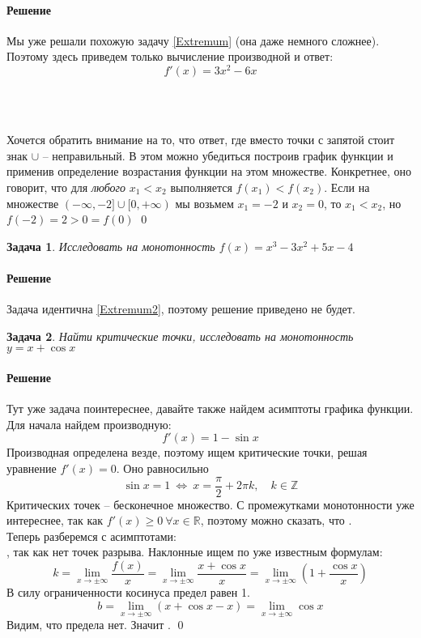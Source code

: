 \documentclass[a4paper,12pt]{report}
\newcommand{\R}{{\mathbb R}}
\newcommand{\fancy}[1]{{\mathbb{#1}}}
\newtheorem{problem}{Задача}[chapter]
\newenvironment{sol}{\paragraph{Решение}}{}
\newcommand{\uni}{\cup}
\begin{document}
	\begin{sol}
		Мы уже решали похожую задачу \ref{Extremum} (она даже немного сложнее). Поэтому здесь приведем только вычисление производной и ответ:
		\[
		f'(x)=3x^2-6x
		\]
		\begin{center}
			\\
			\vspace{1mm}
			\fbox{$f(x)$ возрастает на $(-\infty,-2]; \hspace{2mm} [0,+\infty)$}\\
			\vspace{1mm}
		\end{center}
		Хочется обратить внимание на то, что ответ, где вместо точки с запятой стоит знак $\uni$ -- неправильный. В этом можно убедиться построив график функции и применив определение возрастания функции на этом множестве. Конкретнее, оно говорит, что для \textit{любого} $x_1 < x_2$ выполняется $f(x_1)<f(x_2)$. Если на множестве $(-\infty,-2]\uni[0,+\infty)$ мы возьмем $x_1=-2$ и $x_2=0$, то $x_1<x_2$, но $f(-2)=2>0=f(0)$
		\qed
	\end{sol}
	\begin{problem}
		Исследовать на монотонность $f(x)=x^3-3x^2+5x-4$
	\end{problem}
	\begin{sol}
		Задача идентична \ref{Extremum2}, поэтому решение приведено не будет.
	\end{sol}
	\begin{problem}
		Найти критические точки, исследовать на монотонность $y=x+\cos{x}$
	\end{problem}
	\begin{sol}
		Тут уже задача поинтереснее, давайте также найдем асимптоты графика функции. Для начала найдем производную:
		\[
		f'(x)=1-\sin{x}
		\]
		Производная определена везде, поэтому ищем критические точки, решая уравнение $f'(x)=0$. Оно равносильно
		\[
		\sin{x}=1\ \Leftrightarrow\  x=\frac{\pi}{2}+2\pi k, \quad k \in \fancy{Z}
		\]
		Критических точек -- бесконечное множество. С промежутками монотонности уже интереснее, так как $f'(x)\geq0 \ \forall x\in \R$, поэтому можно сказать, что \fbox{$f(x)$ возрастает на всем $\R$}.\\
		Теперь разберемся с асимптотами:\\
		, так как нет точек разрыва. Наклонные ищем по уже известным формулам:
		\[
		k=\lim\limits_{x\to\pm\infty}{\frac{f(x)}{x}}=\lim\limits_{x\to\pm\infty}{\frac{x+\cos{x}}{x}}=\lim\limits_{x\to\pm\infty}\left(1+\frac{\cos{x}}{x}\right)
		\]
		В силу ограниченности косинуса предел равен 1.
		\[
		b=\lim\limits_{x\to\pm\infty}{(x+\cos{x}-x)}=\lim\limits_{x\to\pm\infty}{\cos{x}}
		\]
		Видим, что предела нет. Значит .
		\qed
	\end{sol}
\end{document}
